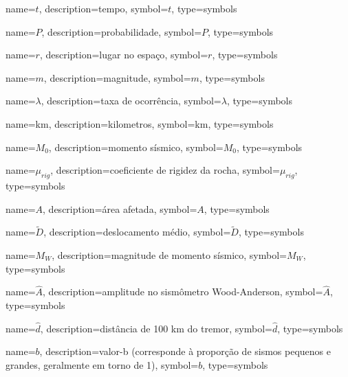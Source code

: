 
{
	name={\ensuremath{t}},
	description={tempo},
	symbol={\ensuremath{t}},
	type=symbols
}

{
	name={\ensuremath{P}},
	description={probabilidade},
	symbol={\ensuremath{P}},
	type=symbols
}


{
	name={\ensuremath{r}},
	description={lugar no espaço},
	symbol={\ensuremath{r}},
	type=symbols
}


{
	name={\ensuremath{m}},
	description={magnitude},
	symbol={\ensuremath{m}},
	type=symbols
}


{
	name={\ensuremath{\lambda}},
	description={taxa de ocorrência},
	symbol={\ensuremath{\lambda}},
	type=symbols
}

{
	name={km},
	description={kilometros},
	symbol={km},
	type=symbols
}


{
	name={\ensuremath{M_0}},
	description={momento sísmico},
	symbol={\ensuremath{M_0}},
	type=symbols
}


{
	name={\ensuremath{\mu_{rig}}},
	description={coeficiente de rigidez da rocha},
	symbol={\ensuremath{\mu_{rig}}},
	type=symbols
}


{
	name={\ensuremath{A}},
	description={área afetada},
	symbol={\ensuremath{A}},
	type=symbols
}


{
	name={\ensuremath{\tilde{D}}},
	description={deslocamento médio},
	symbol={\ensuremath{\tilde{D}}},
	type=symbols
}


{
	name={\ensuremath{M_W}},
	description={magnitude de momento sísmico},
	symbol={\ensuremath{M_W}},
	type=symbols
}

{
	name={\ensuremath{\hat{A}}},
	description={amplitude no sismômetro Wood-Anderson},
	symbol={\ensuremath{\hat{A}}},
	type=symbols
}

{
	name={\ensuremath{\hat{d}}},
	description={distância de 100 km do tremor},
	symbol={\ensuremath{\hat{d}}},
	type=symbols
}


{
	name={\ensuremath{b}},
	description={valor-b (corresponde à proporção de sismos pequenos e grandes, geralmente em torno de 1)},
	symbol={\ensuremath{b}},
	type=symbols
}


